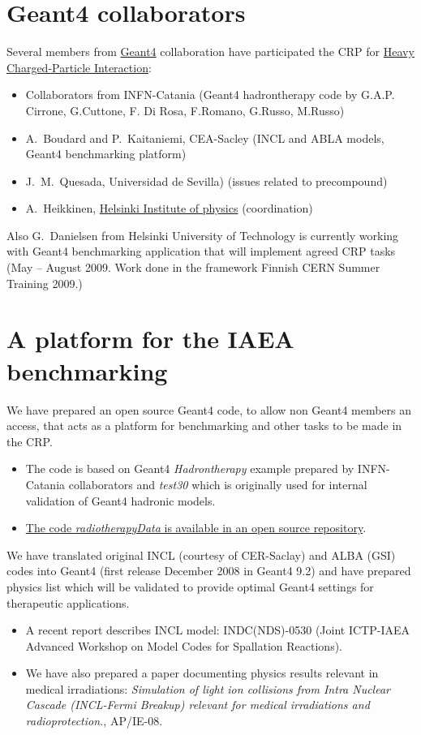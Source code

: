 \documentclass[twoside,floatfix,a4wide]{d}
\numberwithin{equation}{section} %
\begin{document}
\section{Geant4 collaborators}
\vspace{-0.4cm}
Several members from \href{http://geant4.cern.ch}{Geant4} collaboration
have participated the CRP for
\href{http://www-nds.iaea.org/charpar/charpar.htmlx}{Heavy Charged-Particle Interaction}:
\begin{itemize}
\item Collaborators from INFN-Catania 
(Geant4 hadrontherapy code by G.A.P. Cirrone, G.Cuttone, F. Di Rosa, F.Romano, G.Russo, M.Russo)
\item A.~Boudard and P.~Kaitaniemi, CEA-Sacley (INCL and ABLA models, Geant4 benchmarking platform) 
\item J.~M.~Quesada, Universidad de Sevilla) (issues related to precompound)
\item A.~Heikkinen, \href{http://www.hip.fi}{Helsinki Institute of physics} (coordination)
\end{itemize}

Also G.~Danielsen from Helsinki University of Technology is currently working with 
Geant4 benchmarking application that will implement agreed CRP tasks
(May -- August 2009. Work done in the framework Finnish CERN Summer Training 2009.)


\section{A platform for the IAEA benchmarking}
\vspace{-0.4cm}
We have prepared an open source Geant4 code, to allow non Geant4 members an access,
that acts as a  platform for benchmarking and other tasks to be made in the CRP.
\begin{itemize}
\item The code is based on Geant4 {\em Hadrontherapy} example prepared by INFN-Catania collaborators
and {\em test30} which is originally used for internal validation of Geant4 hadronic models.

\item \href{http://github.com/kaitanie/hadrontherapy/}{The code 
{\em radiotherapyData} is available in an open source repository}.
\end{itemize}

We have translated original INCL (courtesy of CER-Saclay) and ALBA (GSI) codes into
Geant4 (first release December 2008 in Geant4 9.2) and 
have prepared physics list which will be validated to provide optimal Geant4 settings 
for therapeutic applications. 
\begin{itemize}
\item  A recent report describes INCL model: INDC(NDS)-0530 
(Joint ICTP-IAEA Advanced Workshop on Model Codes for Spallation Reactions).
\item We have also prepared a paper 
documenting physics results relevant in medical irradiations: 
{\em Simulation of light ion collisions from Intra Nuclear Cascade
(INCL-Fermi Breakup) relevant for medical irradiations and
radioprotection.}, AP/IE-08.
\end{itemize}
\end{document}

